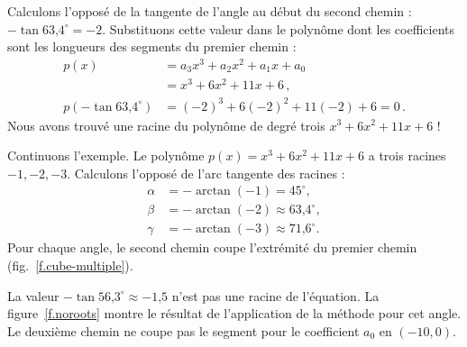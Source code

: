 Calculons l'opposé de la tangente de l'angle au début du second chemin : $-\tan \mbox{63,4}^\circ=-2$. Substituons cette valeur dans le polynôme dont les coefficients sont les longueurs des segments du premier chemin :
\begin{align*}
p(x)&=a_3x^3+a_2x^2+a_1x+a_0\\
&=x^3+6x^2+11x+6\,,\\
p(-\tan \mbox{63,4}^\circ)&=(-2)^3+6(-2)^2+11(-2)+6=0\,.
\end{align*}
Nous avons trouvé une racine du polynôme de degré trois  $x^3+6x^2+11x+6$ !


Continuons l'exemple. Le polynôme $p(x)=x^3+6x^2+11x+6$ a trois racines $-1,-2,-3$. Calculons l'opposé de l'arc tangente des racines :
\begin{align*}
\alpha&=-\arctan (-1) = 45^\circ,\\
\beta&=-\arctan(-2) \approx \mbox{63,4}^\circ,\\
\gamma&=-\arctan(-3)\approx \mbox{71,6}^\circ.
\end{align*}
Pour chaque angle, le second chemin coupe l'extrémité du premier chemin (fig.~\ref{f.cube-multiple}).


La valeur $-\tan \mbox{56,3}^\circ\approx -\mbox{1,5}$ n'est pas une racine de l'équation. La figure~\ref{f.noroots} montre le résultat de l'application de la méthode pour cet angle. Le deuxième chemin ne coupe pas le segment  pour le coefficient $a_0$ en $(-10,0)$.

